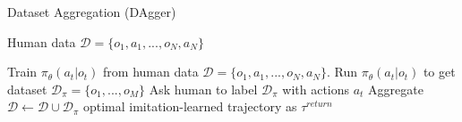 \begin{algorithm}[t!]
\caption{Dataset Aggregation (DAgger)}
\begin{algorithmic}[1]
\label{alg:dagger}
\REQUIRE Human data $\mathcal{D} = \{o_1,a_1,...,o_N,a_N\}$

    \STATE Train $\pi_\theta(a_t|o_t)$ from human data $\mathcal{D} = \{o_1,a_1,...,o_N,a_N\}$.
    \STATE Run $\pi_\theta(a_t|o_t)$ to get dataset $\mathcal{D}_\pi = \{o_1,...,o_M\}$
    \STATE Ask human to label $\mathcal{D}_\pi$ with actions $a_t$
    \STATE Aggregate $\mathcal{D} \leftarrow \mathcal{D} \cup \mathcal{D_\pi}$
\ENDWHILE
\RETURN optimal imitation-learned trajectory as $\tau^{return}$
\end{algorithmic}
\end{algorithm}